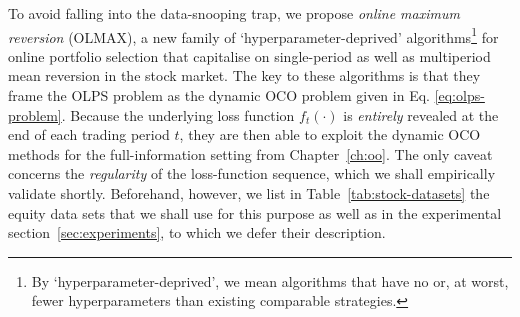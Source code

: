 To avoid falling into the data-snooping trap, we propose \emph{online maximum reversion} (OLMAX), a new family of `hyperparameter-deprived' algorithms\footnote{By `hyperparameter-deprived', we mean algorithms that have no or, at worst, fewer hyperparameters than existing comparable strategies.} for online portfolio selection that capitalise on single-period as well as multiperiod mean reversion in the stock market. The key to these algorithms is that they frame the OLPS problem as the dynamic OCO problem given in Eq. \eqref{eq:olps-problem}. Because the underlying loss function $f_t(\cdot)$ is \emph{entirely} revealed at the end of each trading period $t$, they are then able to exploit the dynamic OCO methods for the full-information setting from Chapter~\ref{ch:oo}. The only caveat concerns the \emph{regularity} of the loss-function sequence, which we shall empirically validate shortly. Beforehand, however, we list in Table~\ref{tab:stock-datasets} the equity data sets that we shall use for this purpose as well as in the experimental section~\ref{sec:experiments}, to which we defer their description.
\begin{table}[H]
  \caption{Summary of the six equity data sets employed for the empirical evaluation.}
  \label{tab:stock-datasets}
  \centering
\end{table}

